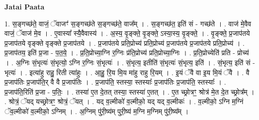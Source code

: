 \documentclass[17pt]{extarticle}
\begin{document}
\textbf{Jatai Paata} \newline

1. स॒ङ्गच्छ॑ते॒ वाजं॒ ॅवाजꣳ॑ स॒ङ्गच्छ॑ते स॒ङ्गच्छ॑ते॒ वाज᳚म् । . स॒ङ्गच्छ॑त॒ इति॑ सं - गच्छ॑ते । . वाज॑ मे॒वैव वाजं॒ ॅवाज॑ मे॒व । . ए॒वास्या᳚ स्यै॒वैवास्य॑ । . अ॒स्य॒ वृ॒ङ्क्ते॒ वृ॒ङ्क्ते॒ ऽस्या॒स्य॒ वृ॒ङ्क्ते॒ । . वृ॒ङ्क्ते॒ प्र॒जाप॑तये प्र॒जाप॑तये वृङ्क्ते वृङ्क्ते प्र॒जाप॑तये । . प्र॒जाप॑तये प्रति॒प्रोच्य॑ प्रति॒प्रोच्य॑ प्र॒जाप॑तये प्र॒जाप॑तये प्रति॒प्रोच्य॑ । . प्र॒जाप॑तय॒ इति॑ प्र॒जा - प॒त॒ये॒ । . प्र॒ति॒प्रोच्या॒ग्नि र॒ग्निः प्र॑ति॒प्रोच्य॑ प्रति॒प्रोच्या॒ग्निः । . प्र॒ति॒प्रोच्येति॑ प्रति - प्रोच्य॑ । . अ॒ग्निः सं॒भृत्यः॑ सं॒भृत्यो॒ ऽग्नि र॒ग्निः सं॒भृत्यः॑ । . सं॒भृत्य॒ इतीति॑ सं॒भृत्यः॑ सं॒भृत्य॒ इति॑ । . सं॒भृत्य॒ इति॑ सं - भृत्यः॑ । . इत्या॑हु राहु॒ रिती त्या॑हुः । . आ॒हु॒ रि॒य मि॒य मा॑हु राहु रि॒यम् । . इ॒यं ॅवै वा इ॒य मि॒यं ॅवै । . वै प्र॒जाप॑तिः प्र॒जाप॑ति॒र् वै वै प्र॒जाप॑तिः । . प्र॒जाप॑ति॒ स्तस्या॒ स्तस्याः᳚ प्र॒जाप॑तिः प्र॒जाप॑ति॒ स्तस्याः᳚ । . प्र॒जाप॑ति॒रिति॑ प्र॒जा - प॒तिः॒ । . तस्या॑ ए॒त दे॒तत् तस्या॒ स्तस्या॑ ए॒तत् । . ए॒त च्छ्रोत्रꣳ॒॒ श्रोत्र॑ मे॒त दे॒त च्छ्रोत्र᳚म् । . श्रोत्रं॒ ॅयद् यच्छ्रोत्रꣳ॒॒ श्रोत्रं॒ ॅयत् । . यद् व॒ल्मीको॑ व॒ल्मीको॒ यद् यद् व॒ल्मीकः॑ । . व॒ल्मीको॒ ऽग्नि म॒ग्निं ॅव॒ल्मीको॑ व॒ल्मीको॒ ऽग्निम् । . अ॒ग्निम् पु॑री॒ष्य॑म् पुरी॒ष्य॑ म॒ग्नि म॒ग्निम् पु॑री॒ष्य᳚म् । \newline
\end{document}
